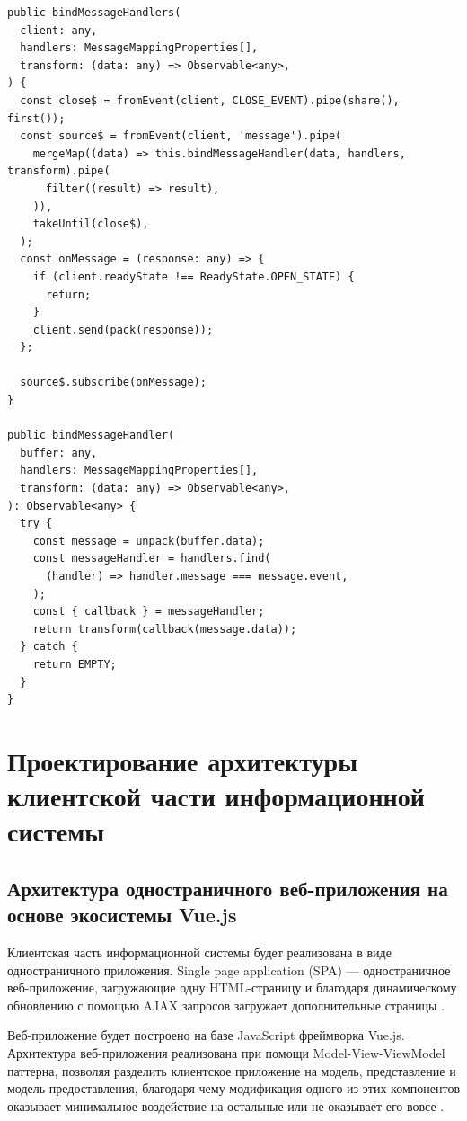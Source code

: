 \begin{lstlisting}[caption={Метод WebSocket адаптера передающий поступающие сообщения на шлюзы Nest.js}, label={ls:ws-adapter}]
public bindMessageHandlers(
  client: any,
  handlers: MessageMappingProperties[],
  transform: (data: any) => Observable<any>,
) {
  const close$ = fromEvent(client, CLOSE_EVENT).pipe(share(), first());
  const source$ = fromEvent(client, 'message').pipe(
    mergeMap((data) => this.bindMessageHandler(data, handlers, transform).pipe(
      filter((result) => result),
    )),
    takeUntil(close$),
  );
  const onMessage = (response: any) => {
    if (client.readyState !== ReadyState.OPEN_STATE) {
      return;
    }
    client.send(pack(response));
  };

  source$.subscribe(onMessage);
}

public bindMessageHandler(
  buffer: any,
  handlers: MessageMappingProperties[],
  transform: (data: any) => Observable<any>,
): Observable<any> {
  try {
    const message = unpack(buffer.data);
    const messageHandler = handlers.find(
      (handler) => handler.message === message.event,
    );
    const { callback } = messageHandler;
    return transform(callback(message.data));
  } catch {
    return EMPTY;
  }
}
\end{lstlisting}

\section{Проектирование архитектуры клиентской части информационной системы}

\subsection{Архитектура одностраничного веб-приложения на основе экосистемы Vue.js}

Клиентская часть информационной системы будет реализована в виде одностраничного приложения. Single page application (SPA) — одностраничное веб-приложение, загружающие одну HTML-страницу и благодаря динамическому обновлению с помощью AJAX запросов загружает дополнительные страницы \cite{SPA}.

Веб-приложение будет построено на базе JavaScript фреймворка Vue.js. Архитектура веб-приложения реализована при помощи Model-View-ViewModel паттерна, позволяя разделить клиентское приложение на модель, представление и модель предоставления, благодаря чему модификация одного из этих компонентов оказывает минимальное воздействие на остальные или не оказывает его вовсе \cite{vuelayout}.


